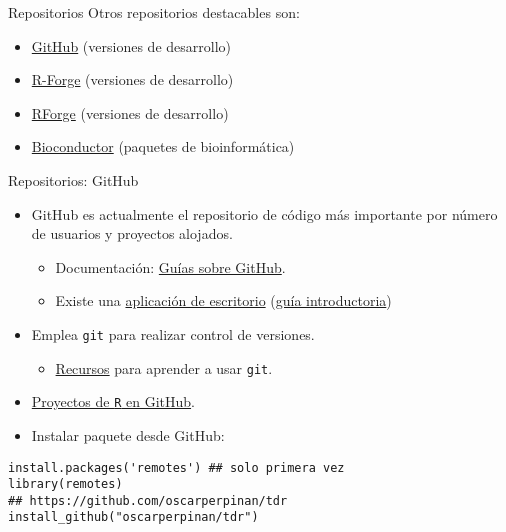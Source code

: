 \documentclass[xcolor={usenames,svgnames,dvipsnames}]{beamer}
\begin{document}
\begin{frame}[label={sec:orgc0125b1}]{Repositorios}
Otros repositorios destacables son:

\begin{itemize}
\item \href{https://github.com/}{GitHub} (versiones de desarrollo)

\item \href{http://r-forge.r-project.org/}{R-Forge} (versiones de desarrollo)

\item \href{http://rforge.net/}{RForge} (versiones de desarrollo)

\item \href{http://www.bioconductor.org/}{Bioconductor} (paquetes de bioinformática)
\end{itemize}
\end{frame}

\begin{frame}[fragile,label={sec:orgb60d851}]{Repositorios: GitHub}
 \begin{itemize}
\item GitHub es actualmente el repositorio de código más importante por número de usuarios y proyectos alojados.
\begin{itemize}
\item Documentación: \href{https://guides.github.com/}{Guías sobre GitHub}.
\item Existe una \href{https://desktop.github.com/}{aplicación de escritorio} (\href{https://help.github.com/desktop/guides/getting-started/}{guía introductoria})
\end{itemize}
\item Emplea \texttt{git} para realizar control de versiones.
\begin{itemize}
\item \href{https://help.github.com/articles/good-resources-for-learning-git-and-github/}{Recursos} para aprender a usar \texttt{git}.
\end{itemize}
\item \href{https://github.com/search?o=desc\&q=language:R\&ref=searchresults\&s=stars\&type=Repositories}{Proyectos de \texttt{R} en GitHub}.
\item Instalar paquete desde GitHub:
\end{itemize}
\lstset{language=r,label= ,caption= ,captionpos=b,numbers=none}
\begin{lstlisting}
install.packages('remotes') ## solo primera vez
library(remotes)
## https://github.com/oscarperpinan/tdr
install_github("oscarperpinan/tdr")
\end{lstlisting}
\end{frame}
\end{document}
